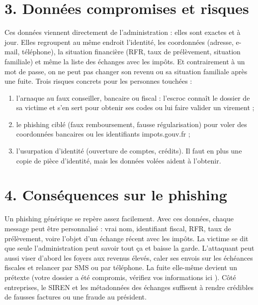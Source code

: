 \documentclass[10pt,a4paper]{article}
\begin{document}
\section{3. Données compromises et risques}
Ces données viennent directement de l'administration : elles sont exactes et à jour. Elles regroupent au même endroit l'identité, les coordonnées (adresse, e-mail, téléphone), la situation financière (RFR, taux de prélèvement, situation familiale) et même la liste des échanges avec les impôts. Et contrairement à un mot de passe, on ne peut pas changer son revenu ou sa situation familiale après une fuite. Trois risques concrets pour les personnes touchées :
\begin{enumerate}
  \item l'arnaque au faux conseiller, bancaire ou fiscal : l'escroc connaît le dossier de sa victime et s'en sert pour obtenir ses codes ou lui faire valider un virement ;
  \item le phishing ciblé (faux remboursement, fausse régularisation) pour voler des coordonnées bancaires ou les identifiants impots.gouv.fr ;
  \item l'usurpation d'identité (ouverture de comptes, crédits). Il faut en plus une copie de pièce d'identité, mais les données volées aident à l'obtenir.
\end{enumerate}

\section{4. Conséquences sur le phishing}
Un phishing générique se repère assez facilement. Avec ces données, chaque message peut être personnalisé : vrai nom, identifiant fiscal, RFR, taux de prélèvement, voire l'objet d'un échange récent avec les impôts. La victime se dit que seule l'administration peut savoir tout ça et baisse la garde. L'attaquant peut aussi viser d'abord les foyers aux revenus élevés, caler ses envois sur les échéances fiscales et relancer par SMS ou par téléphone. La fuite elle-même devient un prétexte (\og votre dossier a été compromis, vérifiez vos informations ici \fg). Côté entreprises, le SIREN et les métadonnées des échanges suffisent à rendre crédibles de fausses factures ou une fraude au président.
\end{document}

